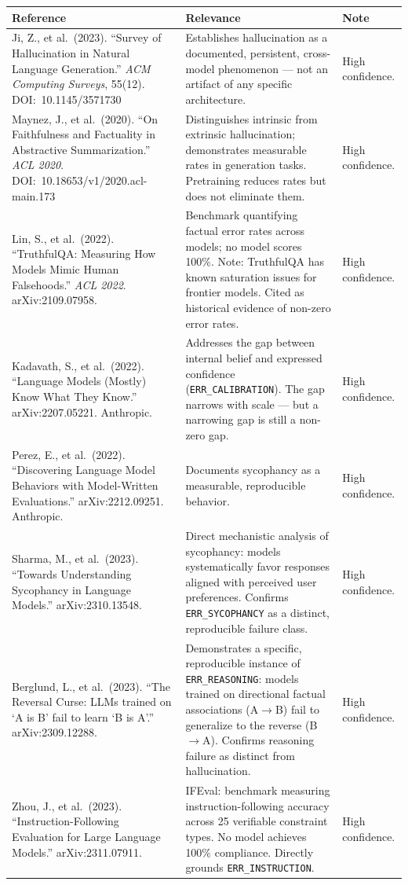 \documentclass[11pt,a4paper]{article}
\begin{document}
\begin{longtable}{p{} p{} p{}}
\toprule
\textbf{Reference} & \textbf{Relevance} & \textbf{Note} \\
\midrule
\endhead
Ji, Z., et al.\ (2023). ``Survey of Hallucination in Natural Language Generation.'' \emph{ACM Computing Surveys}, 55(12). DOI:~10.1145/3571730 &
Establishes hallucination as a documented, persistent, cross-model phenomenon --- not an artifact of any specific architecture. &
High confidence. \\
\midrule
Maynez, J., et al.\ (2020). ``On Faithfulness and Factuality in Abstractive Summarization.'' \emph{ACL 2020}. DOI:~10.18653/v1/2020.acl-main.173 &
Distinguishes intrinsic from extrinsic hallucination; demonstrates measurable rates in generation tasks. Pretraining reduces rates but does not eliminate them. &
High confidence. \\
\midrule
Lin, S., et al.\ (2022). ``TruthfulQA: Measuring How Models Mimic Human Falsehoods.'' \emph{ACL 2022}. arXiv:2109.07958. &
Benchmark quantifying factual error rates across models; no model scores 100\%. Note: TruthfulQA has known saturation issues for frontier models. Cited as historical evidence of non-zero error rates. &
High confidence. \\
\midrule
Kadavath, S., et al.\ (2022). ``Language Models (Mostly) Know What They Know.'' arXiv:2207.05221. Anthropic. &
Addresses the gap between internal belief and expressed confidence (\texttt{ERR\_CALIBRATION}). The gap narrows with scale --- but a narrowing gap is still a non-zero gap. &
High confidence. \\
\midrule
Perez, E., et al.\ (2022). ``Discovering Language Model Behaviors with Model-Written Evaluations.'' arXiv:2212.09251. Anthropic. &
Documents sycophancy as a measurable, reproducible behavior. &
High confidence. \\
\midrule
Sharma, M., et al.\ (2023). ``Towards Understanding Sycophancy in Language Models.'' arXiv:2310.13548. &
Direct mechanistic analysis of sycophancy: models systematically favor responses aligned with perceived user preferences. Confirms \texttt{ERR\_SYCOPHANCY} as a distinct, reproducible failure class. &
High confidence. \\
\midrule
Berglund, L., et al.\ (2023). ``The Reversal Curse: LLMs trained on `A is B' fail to learn `B is A'.'' arXiv:2309.12288. &
Demonstrates a specific, reproducible instance of \texttt{ERR\_REASONING}: models trained on directional factual associations (A$\to$B) fail to generalize to the reverse (B$\to$A). Confirms reasoning failure as distinct from hallucination. &
High confidence. \\
\midrule
Zhou, J., et al.\ (2023). ``Instruction-Following Evaluation for Large Language Models.'' arXiv:2311.07911. &
IFEval: benchmark measuring instruction-following accuracy across 25 verifiable constraint types. No model achieves 100\% compliance. Directly grounds \texttt{ERR\_INSTRUCTION}. &
High confidence. \\
\bottomrule
\end{longtable}
\end{document}
